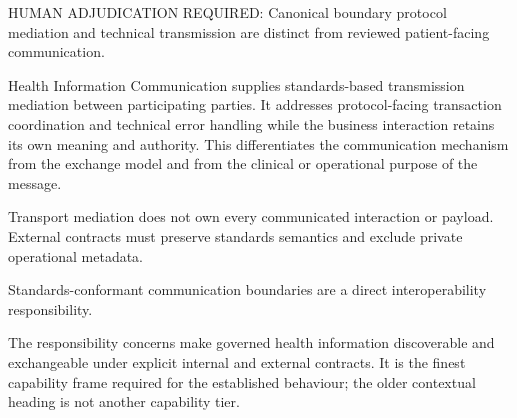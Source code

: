 HUMAN ADJUDICATION REQUIRED: Canonical boundary protocol mediation and technical transmission are distinct from reviewed patient-facing communication.



Health Information Communication supplies standards-based transmission mediation between participating parties. It addresses protocol-facing transaction coordination and technical error handling while the business interaction retains its own meaning and authority. This differentiates the communication mechanism from the exchange model and from the clinical or operational purpose of the message.



Transport mediation does not own every communicated interaction or payload. External contracts must preserve standards semantics and exclude private operational metadata.



Standards-conformant communication boundaries are a direct interoperability responsibility.



The responsibility concerns make governed health information discoverable and exchangeable under explicit internal and external contracts. It is the finest capability frame required for the established behaviour; the older contextual heading is not another capability tier.


